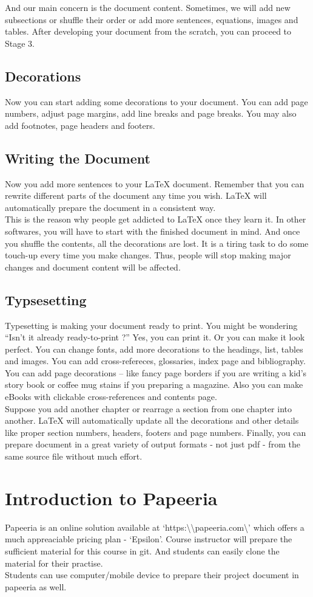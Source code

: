 \documentclass{article}
\begin{document}
	And our main concern is the document content.
	Sometimes, we will add new subsections or shuffle their order or add more sentences, equations, images and tables.
	After developing your document from the scratch, you can proceed to Stage 3.
\subsection{Decorations}
	Now you can start adding some decorations to your document.
	You can add page numbers, adjust page margins, add line breaks and page breaks.
	You may also add footnotes, page headers and footers.
\subsection{Writing the Document}
	Now you add more sentences to your LaTeX document.
	Remember that you can rewrite different parts of the  document any time you wish.
	LaTeX will automatically prepare the document in a consistent way.\\
	
	This is the reason why people get addicted to LaTeX once they learn it.
	In other softwares, you will have to start with the finished document in mind.
	And once you shuffle the contents, all the decorations are lost.
	It is a tiring task to do some touch-up every time you make changes.
	Thus, people will stop making major changes and document content will be affected.
\subsection{Typsesetting}
	Typesetting is making your document ready to print.
	You might be wondering ``Isn't it already ready-to-print ?''
	Yes, you can print it.
	Or you can make it look perfect.
	You can change fonts, add more decorations to the headings, list, tables and images.
	You can add cross-refereces, glossaries, index page and bibliography.
	You can add page decorations -- like fancy page borders if you are writing a kid's story book or coffee mug stains if you preparing a magazine.
	Also you can make eBooks with clickable cross-references and contents page.\\

	Suppose you add another chapter or rearrage a section from one chapter into another.
	LaTeX will automatically update all the decorations and other details like proper section numbers, headers, footers and page numbers.
	Finally, you can prepare document in a great variety of output formats - not just pdf - from the same source file without much effort.
\section{Introduction to Papeeria}
	Papeeria is an online solution available at `https:\textbackslash\textbackslash papeeria.com\textbackslash' which offers a much appreaciable pricing plan - `Epsilon'.
	Course instructor will prepare the sufficient material for this course in git.
	And students can easily clone the material for their practise.\\

	Students can use computer/mobile device to prepare their project document in papeeria as well.
\end{document}
